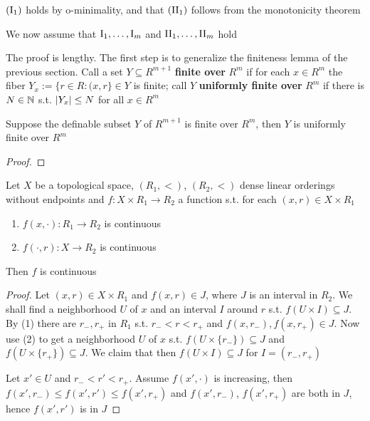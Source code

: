 \documentclass[11pt]{article}
\begin{document}
\((\text{\rom{1}}_1)\) holds by o-minimality, and that \((\text{\rom{2}}_1)\) follows from the monotonicity
theorem

We now assume that \(\text{\rom{1}}_1,\dots,\text{\rom{1}}_m\)
and \(\text{\rom{2}}_1,\dots,\text{\rom{2}}_m\) hold

The proof is lengthy. The first step is to generalize the finiteness lemma of the previous
section. Call a set \(Y\subseteq R^{m+1}\) \textbf{finite over} \(R^m\) if for each \(x\in R^m\) the
fiber \(Y_x:=\{r\in R:(x,r\}\in Y\) is finite; call \(Y\) \textbf{uniformly finite over} \(R^m\) if there
is \(N\in\mathbb{N}\) s.t. \(\abs{Y_x}\le N\) for all \(x\in R^m\)

\begin{lemma}
Suppose the definable subset \(Y\) of \(R^{m+1}\) is finite over \(R^m\), then \(Y\) is uniformly
finite over \(R^m\)
\end{lemma}

\begin{proof}

\end{proof}

\begin{lemma}[]
Let \(X\) be a topological space, \((R_1,<)\), \((R_2,<)\) dense linear orderings without
endpoints and \(f:X\times R_1\to R_2\) a function s.t. for each \((x,r)\in X\times R_1\)
\begin{enumerate}
\item \(f(x,\cdot):R_1\to R_2\) is continuous
\item \(f(\cdot,r):X\to R_2\) is continuous
\end{enumerate}
Then \(f\) is continuous
\end{lemma}

\begin{proof}
Let \((x,r)\in X\times R_1\) and \(f(x,r)\in J\), where \(J\) is an interval in \(R_2\). We shall find a
neighborhood \(U\) of \(x\) and an interval \(I\) around \(r\) s.t. \(f(U\times I)\subseteq J\). By (1) there
are \(r_-,r_+\) in \(R_1\) s.t. \(r_-<r<r_+\) and \(f(x,r_-),f(x,r_+)\in J\). Now use (2) to get a
neighborhood \(U\) of \(x\) s.t. \(f(U\times\{r_-\})\subseteq J\) and \(f(U\times\{r_+\})\subseteq J\). We claim that
then \(f(U\times I)\subseteq J\) for \(I=(r_-,r_+)\)

Let \(x'\in U\) and \(r_-<r'<r_+\). Assume \(f(x',\cdot)\) is increasing,
then \(f(x',r_-)\le f(x',r')\le f(x',r_+)\) and \(f(x',r_-)\), \(f(x',r_+)\) are both in \(J\),
hence \(f(x',r')\) is in \(J\)
\end{proof}
\end{document}
